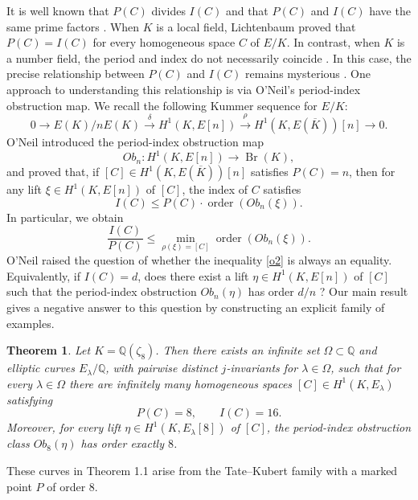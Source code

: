 \documentclass[11pt,a4paper]{amsart}
\newtheorem{theorem}{Theorem}[section]
\theoremstyle{definition}
\newcommand{\Br}{\operatorname{Br}}
\numberwithin{equation}{section}
\begin{document}
It is well known that \(P(C)\) divides \(I(C)\) and that \(P(C)\) and \(I(C)\) have the same prime factors \cite[Proposition 5]{LangTate}. When \(K\) is a local field, Lichtenbaum \cite{Lichtenbaum} proved that \(P(C)=I(C)\) for every homogeneous space \(C\) of \(E/K\). In contrast, when \(K\) is a number field, the period and index do not necessarily coincide \cite{cassels}. In this case, the precise relationship between \(P(C)\) and \(I(C)\) remains mysterious \cite{ClarkSharif,ONeil,sharif1}. One approach to understanding this relationship is via O'Neil's period-index obstruction map. We  recall the following Kummer sequence for \(E/K\):
\begin{equation*}
	0\rightarrow E(K)/nE(K)\xrightarrow{\delta} H^1(K,E[n])\xrightarrow{\rho} H^1(K,E(\overline{K}))[n]\rightarrow 0.
\end{equation*}
O'Neil \cite{ONeil} introduced the period-index obstruction map
\begin{equation*}
	Ob_n: H^1(K,E[n])\rightarrow \Br(K),
\end{equation*}
and proved that, if \([C]\in H^1(K,E(\overline{K}))[n]\) satisfies \(P(C)=n\), then for any lift \(\xi\in H^1(K,E[n])\) of \([C]\), the index of \(C\) satisfies
\begin{equation}\label{equ}
	I(C)\leq P(C)\cdot \operatorname{order}(Ob_n(\xi)).
\end{equation}
In particular, we obtain
\begin{equation}\label{o2}
	\frac{I(C)}{P(C)}
	\leq
	\min_{\rho(\xi)=[C]} \operatorname{order}(Ob_n(\xi)).
\end{equation}
O'Neil \cite{ONeil} raised the question of whether the inequality \eqref{o2} is always an equality. Equivalently, if \(I(C)=d\), does there exist a lift \(\eta\in H^1(K,E[n])\) of \([C]\) such that the period-index obstruction \(Ob_n(\eta)\) has order \(d/n\) ?
Our main result gives a negative answer to this question by constructing an explicit family of examples.
\begin{theorem}\label{mainthm}
	Let $K=\mathbb{Q}(\zeta_8)$.
	Then there exists an infinite set \(\Omega\subset\mathbb{Q}\) and elliptic curves
	\(E_\lambda/\mathbb{Q}\), with pairwise distinct \(j\)-invariants for
	\(\lambda\in\Omega\), such that for every \(\lambda\in\Omega\) there are
	infinitely many homogeneous spaces $	[C]\in H^1(K,E_\lambda)$	satisfying
	\[
 P(C)=8,\qquad I(C)=16.
	\]
	Moreover, for every lift	$\eta\in H^1(K,E_\lambda[8])$	of \([C]\), the period-index obstruction class
	\(Ob_8(\eta)\) has  order exactly \(8\).
\end{theorem}
These curves in Theorem 1.1 arise from the Tate--Kubert family \cite{Kubert,x18} with a
marked point \(P\) of order \(8\).
\end{document}
